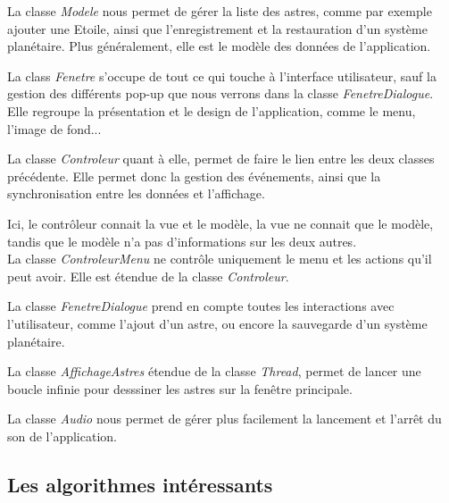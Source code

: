 \documentclass[a4paper,10pt]{article}
\begin{document}
La classe \textit{Modele} nous permet de gérer la liste des astres, comme par exemple ajouter une Etoile, ainsi que l'enregistrement et la restauration d'un système planétaire. Plus généralement, elle est le modèle des données de l'application.

La class \textit{Fenetre} s'occupe de tout ce qui touche à l'interface utilisateur, sauf la gestion des différents pop-up que nous verrons dans la classe \textit{FenetreDialogue}. Elle regroupe la présentation et le design de l'application, comme le menu, l'image de fond...

La classe \textit{Controleur} quant à elle, permet de faire le lien entre les deux classes précédente. Elle permet donc la gestion des événements, ainsi que la synchronisation entre les données et l'affichage.

Ici, le contrôleur connait la vue et le modèle, la vue ne connait que le modèle, tandis que le modèle n'a pas d'informations sur les deux autres.\\

La classe \textit{ControleurMenu} ne contrôle uniquement le menu et les actions qu'il peut avoir. Elle est étendue de la classe \textit{Controleur}.

La classe \textit{FenetreDialogue} prend en compte toutes les interactions avec l'utilisateur, comme l'ajout d'un astre, ou encore la sauvegarde d'un système planétaire.

La classe \textit{AffichageAstres} étendue de la classe \textit{Thread}, permet de lancer une boucle infinie pour desssiner les astres sur la fenêtre principale.

La classe \textit{Audio} nous permet de gérer plus facilement la lancement et l'arrêt du son de l'application.

\subsection{Les algorithmes intéressants}
\end{document}
